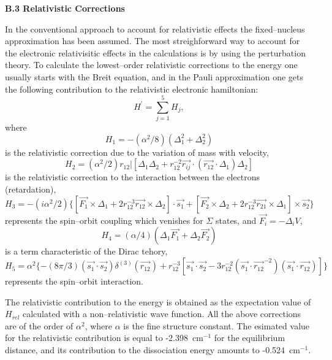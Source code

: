 {{\vspace{2mm}
\noindent
{\bf B.3 Relativistic Corrections}



In the conventional approach to account for relativistic 
effects the 
fixed--nucleus approximation has been assumed.
The most streighforward way to account for the 
electronic relativisitic
effects in the calculations is by using the perturbation theory.
To calculate the lowest--order relativistic corrections to the
energy one usually starts with the Breit equation,\cite{k15}
and in the Pauli approximation one gets the following contribution to the 
relativistic electronic hamiltonian:
\begin{equation}
H^{\prime} = \sum_{j=1}^{5} H_j,
\end{equation}
where
\begin{equation}
H_1 = -(\alpha^2/8)(\Delta_1^2 + \Delta_2^2)
\end{equation}
is the relativistic correction due to the variation of mass with velocity,
\begin{equation} 
H_2 = (\alpha^2/2) r_{12} | [\Delta_1 \Delta_2 +
r_{12}^{-2} \vec{r_{ij}} \cdot (\vec{r_{12}} \cdot \Delta_1)\Delta_2]
\end{equation}
is the relativistic correction to the interaction
between the electrons (retardation),
\begin{equation}
H_3 = -(i \alpha^2/2) \{ [ \vec{F_1} \times \Delta_1 +
2 r_{12}^{-3}  \vec{r_{12}} \times \Delta_2 ] \cdot \vec{s_1}
+ [\vec{F_2} \times \Delta_2 + 2 r_{12}^{-3} \vec{r_{21}}
\times \Delta_1] \times \vec{s_2} \}
\end{equation}
represents the spin--orbit coupling which venishes for $\Sigma$
states, and $\vec{F_i} = -\Delta_i V$,
\begin{equation}
H_4 = (\alpha / 4) (\Delta_1 \vec{F_1} + \Delta_2 \vec{F_2})
\end{equation}
is a term  characteristic of the Dirac tehory,
\begin{equation}
H_5 = \alpha^2 \{ -(8\pi/3)(\vec{s_1} \cdot \vec{s_2})
\delta^{(3)}(\vec{r_{12}}) +
r_{12}^{-3} [\vec{s_1} \cdot \vec{s_2} -
3 r_{12}^{-2} (\vec{s_1} \cdot \vec{r_{12}}^{-2})
(\vec{s_1} \cdot \vec{r_{12}} ) ] \}
\end{equation}
represents the spin--orbit interaction.

The relativistic contribution to the energy is obtained as the 
expectation value of $H_{rel}$ calculated with a non--relativistic
wave function. All the above corrections are of the order of
$\alpha^2$, where $\alpha$ is the fine structure constant.
The esimated value for the relativistic contribution is 
equal to -2.398~cm$^{-1}$ for the equilibrium distance,\cite{kk} and
its contribution to the dissociation energy amounts to
-0.524~cm$^{-1}$.

}}
